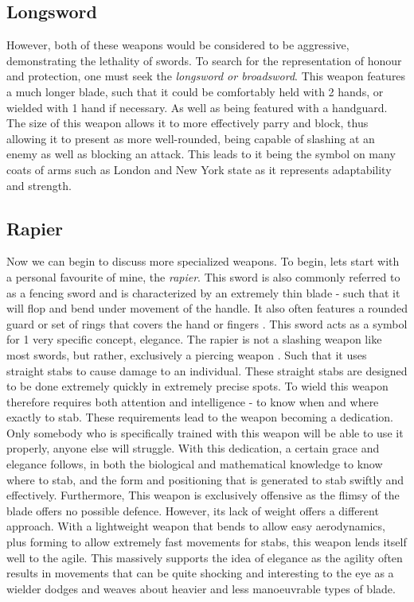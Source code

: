 \documentclass{article}
\begin{document}
\subsection*{Longsword}
However, both of these weapons would be considered to be aggressive, demonstrating the lethality of swords. To search for the representation of honour and protection, one must seek the \emph{longsword or broadsword}. This weapon features a much longer blade, such that it could be comfortably held with 2 hands, or wielded with 1 hand if necessary. As well as being featured with a handguard. The size of this weapon allows it to more effectively parry and block, thus allowing it to present as more well-rounded, being capable of slashing at an enemy as well as blocking an attack. This leads to it being the symbol on many coats of arms such as London \parencite{fox1894book} and New York state \parencite{newyorkflag} as it represents adaptability and strength.

\subsection*{Rapier}
Now we can begin to discuss more specialized weapons. To begin, lets start with a personal favourite of mine, the \emph{rapier}. This sword is also commonly referred to as a fencing sword and is characterized by an extremely thin blade - such that it will flop and bend under movement of the handle. It also often features a rounded guard or set of rings that covers the hand or fingers \parencite{walker2002rapier12}. This sword acts as a symbol for 1 very specific concept, elegance. The rapier is not a slashing weapon like most swords, but rather, exclusively a piercing weapon \parencite{walker2002rapierNoCut}. Such that it uses straight stabs to cause damage to an individual. These straight stabs are designed to be done extremely quickly in extremely precise spots. To wield this weapon therefore requires both attention and intelligence - to know when and where exactly to stab. These requirements lead to the weapon becoming a dedication. Only somebody who is specifically trained with this weapon will be able to use it properly, anyone else will struggle. With this dedication, a certain grace and elegance follows, in both the biological and mathematical knowledge \parencite{walker2002rapier25} to know where to stab, and the form and positioning that is generated to stab swiftly and effectively. Furthermore, This weapon is exclusively offensive as the flimsy of the blade offers no possible defence. However, its lack of weight offers a different approach. With a lightweight weapon that bends to allow easy aerodynamics, plus forming to allow extremely fast movements for stabs, this weapon lends itself well to the agile. This massively supports the idea of elegance as the agility often results in movements that can be quite shocking and interesting to the eye as a wielder dodges and weaves about heavier and less manoeuvrable types of blade.
\end{document}

